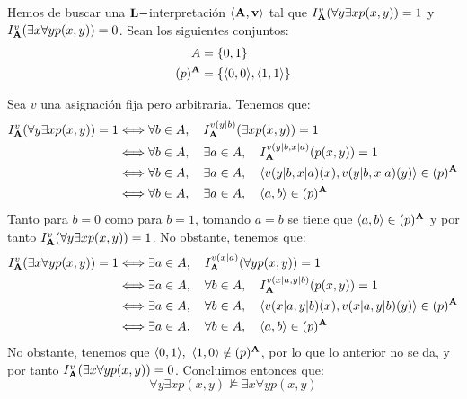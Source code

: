 \begin{ejercicio}
\begin{enumerate}
        Hemos de buscar una $\bf{L}-$interpretación $\langle \bf{A},v\rangle$ tal que $I_{\bf{A}}^v(\forall y\exists x p(x,y))=1$ y $I_{\bf{A}}^v(\exists x\forall y p(x,y))=0$.
        Sean los siguientes conjuntos:
        \begin{align*}
            A&=\{0,1\}\\
            (p)^{\bf{A}}&=\{\langle 0,0\rangle,\langle 1,1\rangle\}
        \end{align*}

        Sea $v$ una asignación fija pero arbitraria. Tenemos que:
        \begin{align*}
            I_{\bf{A}}^v(\forall y\exists x p(x,y)) = 1
            & \Longleftrightarrow \forall b\in A,\quad  I_{\bf{A}}^{v(y|b)}(\exists x p(x,y))=1\\
            & \Longleftrightarrow \forall b\in A,\quad  \exists a\in A,\quad I_{\bf{A}}^{v(y|b,x|a)}(p(x,y))=1\\
            & \Longleftrightarrow \forall b\in A,\quad  \exists a\in A,\quad \langle v(y|b,x|a)(x),v(y|b,x|a)(y)\rangle\in (p)^{\bf{A}}\\
            & \Longleftrightarrow \forall b\in A,\quad  \exists a\in A,\quad \langle a,b\rangle\in (p)^{\bf{A}}
        \end{align*}
        Tanto para $b=0$ como para $b=1$, tomando $a=b$ se tiene que $\langle a,b\rangle\in (p)^{\bf{A}}$ y por tanto $I_{\bf{A}}^v(\forall y\exists x p(x,y))=1$. No obstante, tenemos que:
        \begin{align*}
            I_{\bf{A}}^v(\exists x\forall y p(x,y)) = 1
            & \Longleftrightarrow \exists a\in A,\quad  I_{\bf{A}}^{v(x|a)}(\forall y p(x,y))=1\\
            & \Longleftrightarrow \exists a\in A,\quad  \forall b\in A,\quad I_{\bf{A}}^{v(x|a,y|b)}(p(x,y))=1\\
            & \Longleftrightarrow \exists a\in A,\quad  \forall b\in A,\quad \langle v(x|a,y|b)(x),v(x|a,y|b)(y)\rangle\in (p)^{\bf{A}}\\
            & \Longleftrightarrow \exists a\in A,\quad  \forall b\in A,\quad \langle a,b\rangle\in (p)^{\bf{A}}
        \end{align*}
        No obstante, tenemos que $\langle 0,1\rangle,~\langle 1,0\rangle\notin (p)^{\bf{A}}$,
        por lo que lo anterior no se da, y por tanto $I_{\bf{A}}^v(\exists x\forall y p(x,y))=0$.
        Concluimos entonces que:
        \[\forall y\exists x p(x,y)\not\models \exists x\forall y p(x,y)\]


\end{enumerate}
\end{ejercicio}
